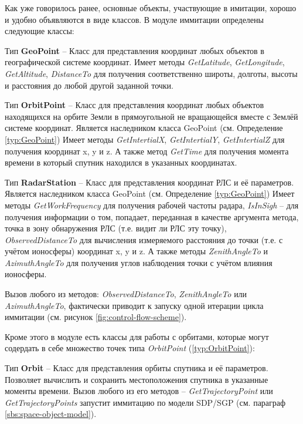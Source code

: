 Как уже говорилось ранее, основные объекты, участвующие в имитации, хорошо и удобно объявляются в виде классов. В
модуле иммитации определены следующие классы:
\begin{mydef} \label{typ:GeoPoint}
Тип \textbf{GeoPoint} -- Класс для представления координат любых объектов в географической системе координат. 
Имеет методы \textit{GetLatitude}, \textit{GetLongitude}, \textit{GetAltitude}, \textit{DistanceTo} для получения соответственно широты, долготы, высоты и расстояния до любой другой заданной точки.
\end{mydef}
\begin{mydef} \label{typ:OrbitPoint}
Тип \textbf{OrbitPoint} -- Класс для представления координат любых объектов находящихся на орбите Земли 
в прямоугольной не вращающейся вместе с Землёй системе координат. Является наследником класса GeoPoint 
(см. Определение \ref{typ:GeoPoint})
Имеет методы \textit{GetIntertialX}, \textit{GetIntertialY}, \textit{GetIntertialZ} для получения 
координат x, y и z. А также метод \textit{GetTime} для получения момента времени в который спутник находился в 
указанных координатах.
\end{mydef}
\begin{mydef} \label{typ:RadarStation}
Тип \textbf{RadarStation} -- Класс для представления координат РЛС и её параметров. Является наследником класса 
GeoPoint (см. Определение \ref{typ:GeoPoint})
Имеет методы \textit{GetWorkFrequency} для получения рабочей частоты радара, \textit{IsInSigh} -- для получения
информации о том, попадает, переданная в качестве аргумента метода, точка в зону обнаружения РЛС (т.е. видит ли РЛС
эту точку), \textit{ObservedDistanceTo} для вычисления измеряемого расстояния до точки (т.е. с учётом ионосферы)
координат x, y и z. А также методы \textit{ZenithAngleTo} и \textit{AzimuthAngleTo} для получения углов наблюдения 
точки с учётом влияния ионосферы.
\end{mydef}

Вызов любого из методов: \textit{ObservedDistanceTo}, \textit{ZenithAngleTo} или \textit{AzimuthAngleTo}, фактически
приводит к запуску одной итерации цикла иммитации (см. рисунок \ref{fig:control-flow-scheme}).

Кроме этого в модуле есть классы для работы с орбитами, которые могут содердать в себе множество точек типа 
\textit{OrbitPoint} (\ref{typ:OrbitPoint}):
\begin{mydef} \label{typ:Orbit}
Тип \textbf{Orbit} -- Класс для представления орбиты спутника и её параметров. Позволяет вычислить и сохранить
местоположения спутника в указанные моменты времени. Вызов любого из его методов -- \textit{GetTrajectoryPoint} 
или \textit{GetTrajectoryPoints} запустит иммитацию по модели SDP/SGP (см. параграф \ref{sbs:space-object-model}).
\end{mydef}

